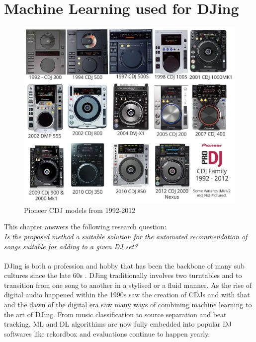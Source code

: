 
\graphicspath{{Chapter3/}}

\chapter{Machine Learning used for DJing}

\begin{figure}[H]
	\includegraphics[scale=0.3]{images/pioneers_history}
	\centering
	\caption{Pioneer CDJ models from 1992-2012 } 
\end{figure}

This chapter answers the following research question:
\\

\textit{Is the proposed method a suitable solution for the automated recommendation of songs suitable for adding to a given DJ set?} 
\\
\\
DJing is both a profession and hobby that has been the backbone of many sub cultures since the late 60s \citep{brewster_last_2014}. DJing traditionally involves two turntables and to transition from one song to another in a stylised or a fluid manner. As the rise of digital audio happened within the 1990s saw the creation of CDJs and with that and the dawn of the digital era saw many ways of combining machine learning to the art of DJing. From music classification to source separation and beat tracking. ML and DL algorithims are now fully embedded into popular DJ softwares like rekordbox and evaluations continue to happen yearly. 

